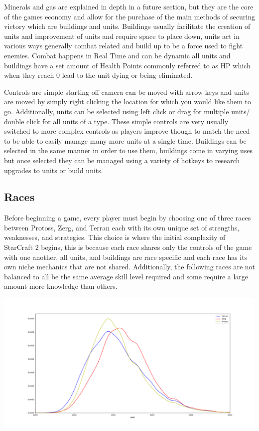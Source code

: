 \documentclass[a4paper,12pt]{report}
\begin{document}
Minerals and gas are explained in depth in a future section, but they are the core of the games economy and allow for the purchase of the main methods of securing victory which are buildings and units. Buildings usually facilitate the creation of units and improvement of units and require space to place down, units act in various ways generally combat related and build up to be a force used to fight enemies. Combat happens in Real Time and can be dynamic all units and buildings have a set amount of Health Points commonly referred to as HP which when they reach 0 lead to the unit dying or being eliminated.

Controls are simple starting off camera can be moved with arrow keys and units are moved by simply right clicking the location for which you would like them to go. Additionally, units can be selected using left click or drag for multiple units/ double click for all units of a type. These simple controls are very usually switched to more complex controls as players improve though to match the need to be able to easily manage many more units at a single time. Buildings can be selected in the same manner in order to use them, buildings come in varying uses but once selected they can be managed using a variety of hotkeys to research upgrades to units or build units.

\subsection{Races}

Before beginning a game, every player must begin by choosing one of three races between Protoss, Zerg, and Terran each with its own unique set of strengths, weaknesses, and strategies. This choice is where the initial complexity of StarCraft 2 begins, this is because each race shares only the controls of the game with one another, all units, and buildings are race specific and each race has its own niche mechanics that are not shared. Additionally, the following races are not balanced to all be the same average skill level required and some require a large amount more knowledge than others.

\begin{center}
    \captionsetup{type=figure}
    \includegraphics[width=.5\linewidth]{media/MMRvsRace.png}
\end{center}
\end{document}
